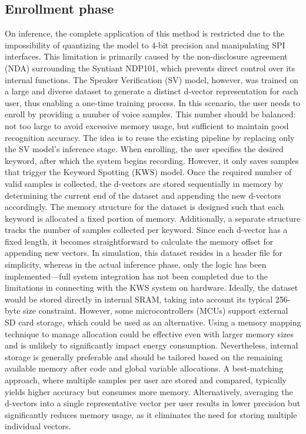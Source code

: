 \subsection{Enrollment phase}
\label{subsec:enrollment} 
On inference, the complete application of this method is restricted due to the impossibility of quantizing the model to 4-bit precision and manipulating SPI interfaces. This limitation is primarily caused by the non-disclosure agreement (NDA) surrounding the Syntiant NDP101, which prevents direct control over its internal functions. The Speaker Verification (SV) model, however, was trained on a large and diverse dataset to generate a distinct d-vector representation for each user, thus enabling a one-time training process. In this scenario, the user needs to enroll by providing a number of voice samples. This number should be balanced: not too large to avoid excessive memory usage, but sufficient to maintain good recognition accuracy. The idea is to reuse the existing pipeline by replacing only the SV model’s inference stage. When enrolling, the user specifies the desired keyword, after which the system begins recording. However, it only saves samples that trigger the Keyword Spotting (KWS) model. Once the required number of valid samples is collected, the d-vectors are stored sequentially in memory by determining the current end of the dataset and appending the new d-vectors accordingly.
The memory structure for the dataset is designed such that each keyword is allocated a fixed portion of memory. Additionally, a separate structure tracks the number of samples collected per keyword. Since each d-vector has a fixed length, it becomes straightforward to calculate the memory offset for appending new vectors. In simulation, this dataset resides in a header file for simplicity, whereas in the actual inference phase, only the logic has been implemented—full system integration has not been completed due to the limitations in connecting with the KWS system on hardware. Ideally, the dataset would be stored directly in internal SRAM, taking into account its typical 256-byte size constraint. However, some microcontrollers (MCUs) support external SD card storage, which could be used as an alternative. Using a memory mapping technique to manage allocation could be effective even with larger memory sizes and is unlikely to significantly impact energy consumption. Nevertheless, internal storage is generally preferable and should be tailored based on the remaining available memory after code and global variable allocations. A best-matching approach, where multiple samples per user are stored and compared, typically yields higher accuracy but consumes more memory. Alternatively, averaging the d-vectors into a single representative vector per user results in lower precision but significantly reduces memory usage, as it eliminates the need for storing multiple individual vectors.
